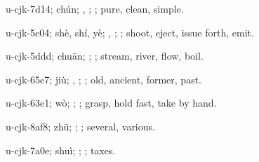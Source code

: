 \begin{multicols}{2}
{\cjkgGlue{}u-cjk-7d14; chún; \cjkgGlue{}, \cjkgGlue{}; \cjkgGlue{}; pure, clean, simple.

\cjkgGlue{}u-cjk-5c04; shè, shí, yè; \cjkgGlue{}\cjkgGlue{}\cjkgGlue{}, \cjkgGlue{}\cjkgGlue{}\cjkgGlue{}; \cjkgGlue{}; shoot, eject, issue forth, emit.

\cjkgGlue{}u-cjk-5ddd; chuān; \cjkgGlue{}; \cjkgGlue{}; stream, river, flow, boil.

\cjkgGlue{}u-cjk-65e7; jiù; \cjkgGlue{}\cjkgGlue{}\cjkgGlue{}, \cjkgGlue{}; \cjkgGlue{}; old, ancient, former, past.

\cjkgGlue{}u-cjk-63e1; wò; \cjkgGlue{}\cjkgGlue{}\cjkgGlue{}; \cjkgGlue{}; grasp, hold fast, take by hand.

\cjkgGlue{}u-cjk-8af8; zhū; \cjkgGlue{}; \cjkgGlue{}; several, various.

\cjkgGlue{}u-cjk-7a0e; shuì; \cjkgGlue{}; \cjkgGlue{}; taxes.

}
\end{multicols}
